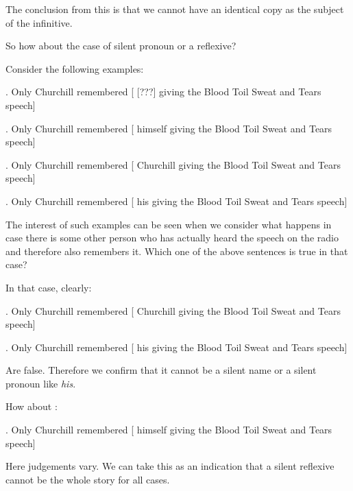 \begin{frame}
  The conclusion from this is that we cannot have an identical copy as the subject of the infinitive. 
 

So how about the case of silent pronoun or a reflexive?
\end{frame}


\begin{frame}
  Consider the following examples:

\ex.  
Only Churchill remembered [ [???] giving the Blood Toil Sweat and Tears speech]

\ex.  
Only Churchill remembered [ himself giving the Blood Toil Sweat and Tears speech]

\ex.  
Only Churchill remembered [ Churchill  giving the Blood Toil Sweat and Tears speech]

\ex.  
Only Churchill remembered [ his giving the Blood Toil Sweat and Tears speech]

\end{frame}

\begin{frame}

  The interest of such examples can be seen when we consider what happens in case there is some other person who has actually heard the speech on the radio and therefore also remembers it. Which one of the above sentences is true in that case?

\end{frame}



\begin{frame}
  In that case, clearly:

\ex.  
Only Churchill remembered [ Churchill  giving the Blood Toil Sweat and Tears speech]

\ex.  
Only Churchill remembered [ his giving the Blood Toil Sweat and Tears speech]


Are false.  Therefore we confirm that it cannot be a silent name or a silent pronoun like \textit{his}.

\end{frame}

\begin{frame}
  How about :

\ex.  
Only Churchill remembered [ himself giving the Blood Toil Sweat and Tears speech]


Here judgements vary.  We can take this as an indication that a silent reflexive cannot be the whole story for all cases.


\end{frame}




